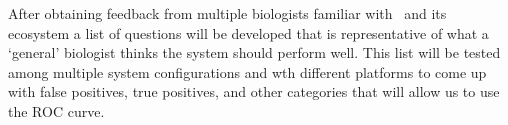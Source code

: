 After obtaining feedback from multiple biologists familiar with \GN\ and its ecosystem a list of questions will be developed that is representative of what a `general' biologist thinks the system should perform well. 
This list will be tested among multiple system configurations and wth different platforms to come up with false positives, true positives, and other categories that will allow us to use the ROC curve.

